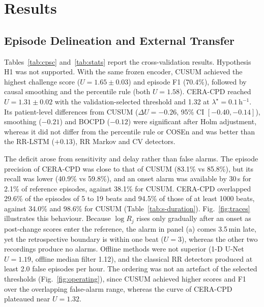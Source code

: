 \documentclass[preprint,12pt]{elsarticle}
\newcommand{\method}{CERA-CPD}
\newcommand{\1}{\mathbf{1}}
\begin{document}
\section{Results}
\label{sec:results}

\subsection{Episode Delineation and External Transfer}
\label{sec:res-cpsc}
\label{sec:res-ext}
Tables~\ref{tab:cpsc} and~\ref{tab:stats} report the cross-validation results. Hypothesis H1 was not supported. With the same frozen encoder, CUSUM achieved the highest challenge score ($U=1.65\pm0.03$) and episode F1 (70.4\%), followed by causal smoothing and the percentile rule (both $U=1.58$). \method{} reached $U=1.31\pm0.02$ with the validation-selected threshold and 1.32 at $\lambda^\star=0.1$\,h$^{-1}$. Its patient-level differences from CUSUM ($\Delta U=-0.26$, 95\% CI $[-0.40,-0.14]$), smoothing ($-0.21$) and BOCPD ($-0.12$) were significant after Holm adjustment, whereas it did not differ from the percentile rule or COSEn and was better than the RR-LSTM ($+0.13$), RR Markov and CV detectors.

The deficit arose from sensitivity and delay rather than false alarms. The episode precision of \method{} was close to that of CUSUM (83.1\% vs 85.8\%), but its recall was lower (40.9\% vs 59.8\%), and an onset alarm was available by 30\,s for 2.1\% of reference episodes, against 38.1\% for CUSUM. \method{} overlapped 29.6\% of the episodes of 5 to 19 beats and 94.5\% of those of at least 1000 beats, against 34.0\% and 98.6\% for CUSUM (Table~\ref{tab:s-duration}). Fig.~\ref{fig:traces} illustrates this behaviour. Because $\log R_j$ rises only gradually after an onset as post-change scores enter the reference, the alarm in panel (a) comes 3.5\,min late, yet the retrospective boundary is within one beat ($U=3$), whereas the other two recordings produce no alarms. Offline methods were not superior (1-D U-Net $U=1.19$, offline median filter 1.12), and the classical RR detectors produced at least 2.0 false episodes per hour. The ordering was not an artefact of the selected thresholds (Fig.~\ref{fig:operating}), since CUSUM achieved higher scores and F1 over the overlapping false-alarm range, whereas the curve of \method{} plateaued near $U=1.32$.





\end{document}

